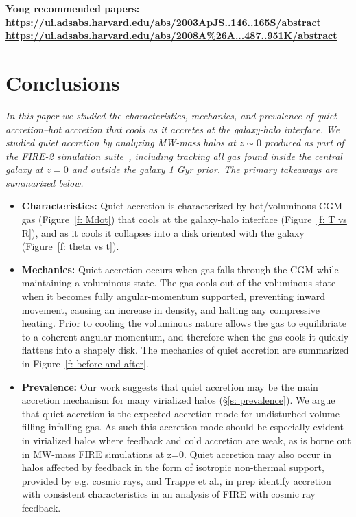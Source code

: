\documentclass[fleqn,usenatbib]{mnras}
\begin{document}
\textbf{
Yong recommended papers:
\url{https://ui.adsabs.harvard.edu/abs/2003ApJS..146..165S/abstract}
\url{https://ui.adsabs.harvard.edu/abs/2008A\%26A...487..951K/abstract}
}

\section{Conclusions}
\label{s: conclusions}

\textit{
In this paper we studied the characteristics, mechanics, and prevalence of quiet accretion--hot accretion that cools as it accretes at the galaxy-halo interface.
We studied quiet accretion by analyzing MW-mass halos at $z \sim 0$ produced as part of the FIRE-2 simulation suite~\cite{Hopkins2018}, including tracking all gas found inside the central galaxy at $z=0$ and outside the galaxy 1 Gyr prior.
The primary takeaways are summarized below.
}
\begin{itemize}
    \item \textbf{Characteristics:} Quiet accretion is characterized by hot/voluminous CGM gas (Figure~\ref{f: Mdot}) that cools at the galaxy-halo interface (Figure~\ref{f: T vs R}), and as it cools it collapses into a disk oriented with the galaxy (Figure~\ref{f: theta vs t}).
    \item \textbf{Mechanics:} Quiet accretion occurs when gas falls through the CGM while maintaining a voluminous state.
    The gas cools out of the voluminous state when it becomes fully angular-momentum supported, preventing inward movement, causing an increase in density, and halting any compressive heating.
    Prior to cooling the voluminous nature allows the gas to equilibriate to a coherent angular momentum, and therefore when the gas cools it quickly flattens into a shapely disk.
    The mechanics of quiet accretion are summarized in Figure~\ref{f: before and after}.
    \item \textbf{Prevalence:} Our work suggests that quiet accretion may be the main accretion mechanism for many virialized halos (\S\ref{s: prevalence}).
    We argue that quiet accretion is the expected accretion mode for undisturbed volume-filling infalling gas.
    As such this accretion mode should be especially evident in virialized halos where feedback and cold accretion are weak, as is borne out in MW-mass FIRE simulations at z=0.
    Quiet accretion may also occur in halos affected by feedback in the form of isotropic non-thermal support, provided by e.g. cosmic rays, and Trappe et al., in prep identify accretion with consistent characteristics in an analysis of FIRE with cosmic ray feedback.
\end{itemize}
\end{document}
